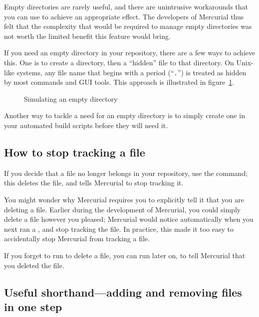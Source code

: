 Empty directories are rarely useful, and there are unintrusive
workarounds that you can use to achieve an appropriate effect.  The
developers of Mercurial thus felt that the complexity that would be
required to manage empty directories was not worth the limited benefit
this feature would bring.

If you need an empty directory in your repository, there are a few
ways to achieve this. One is to create a directory, then  a
``hidden'' file to that directory.  On Unix-like systems, any file
name that begins with a period (``\texttt{.}'') is treated as hidden
by most commands and GUI tools.  This approach is illustrated in
figure~\ref{ex:daily:empty}.

\begin{figure}[ht]
  \caption{Simulating an empty directory}
  \label{ex:daily:empty}
\end{figure}

Another way to tackle a need for an empty directory is to simply
create one in your automated build scripts before they will need it.

\subsection{How to stop tracking a file}

If you decide that a file no longer belongs in your repository, use
the  command; this deletes the file, and tells Mercurial
to stop tracking it.

You might wonder why Mercurial requires you to explicitly tell it that
you are deleting a file.  Earlier during the development of Mercurial,
you could simply delete a file however you pleased; Mercurial would
notice automatically when you next ran a , and stop
tracking the file.  In practice, this made it too easy to accidentally
stop Mercurial from tracking a file.

If you forget to run  to delete a file, you can run
 later on, to tell Mercurial that you
deleted the file.

\subsection{Useful shorthand---adding and removing files in one step}



